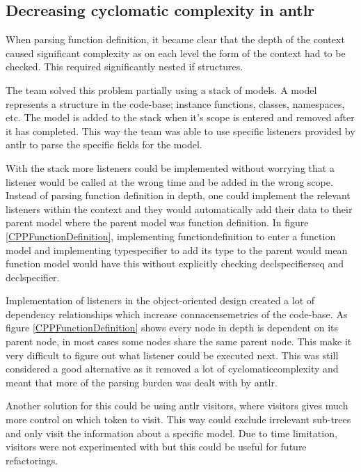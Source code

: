 \subsection{Decreasing cyclomatic complexity in antlr}

When parsing function definition, it became clear that the depth of the context caused significant complexity as on each level the form of the context had to be checked. This required significantly nested if structures.

The team solved this problem partially using a stack of models. A model represents a structure in the code-base; instance functions, classes, namespaces, etc. The model is added to the stack when it's scope is entered and removed after it has completed. This way the team was able to use specific listeners provided by \gls{antlr} to parse the specific fields for the model. 

With the stack more listeners could be implemented without worrying that a listener would be called at the wrong time and be added in the wrong scope. Instead of parsing function definition in depth, one could implement the relevant listeners within the context and they would automatically add their data to their parent model where the parent model was function definition.
In figure \ref{CPPFunctionDefinition}, implementing functiondefinition to enter a function model and implementing typespecifier to add its type to the parent would mean function model would have this without explicitly checking declspecifierseq and declspecifier. 

Implementation of listeners in the object-oriented design created a lot of dependency relationships which increase \gls{connacensemetrics} of the code-base. As figure \ref{CPPFunctionDefinition} shows every node in depth is dependent on its parent node, in most cases some nodes share the same parent node. This make it very difficult to figure out what listener could be executed next. This was still considered a good alternative as it removed a lot of \gls{cyclomaticcomplexity} and meant that more of the parsing burden was dealt with by \gls{antlr}. 

Another solution for this could be using \gls{antlr} visitors, where visitors gives much more control on which token to visit. This way could exclude irrelevant sub-trees and only visit the information about a specific model. Due to time limitation, visitors were not experimented with but this could be useful for future refactorings.

